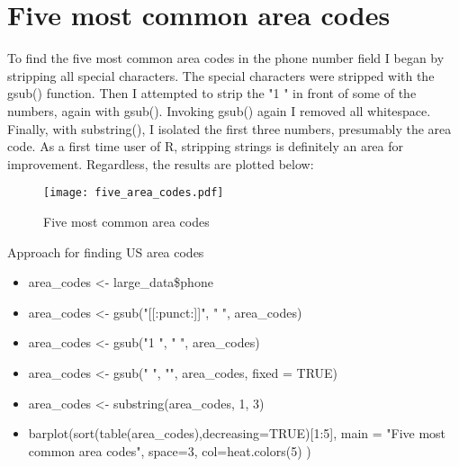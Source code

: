 \documentclass[12pt,fleqn]{report} %
\begin{document}

\chapter{Five most common area codes}

To find the five most common area codes in the phone number field I began by stripping all special characters. The special characters were stripped with the gsub() function. Then I attempted to strip the "1 " in front of some of the numbers, again with gsub(). Invoking gsub() again I removed all whitespace. Finally, with substring(), I isolated the first three numbers, presumably the area code. As a first time user of R, stripping strings is definitely an area for improvement. Regardless, the results are plotted below: 

\begin{figure}[h]
    \centering
    \texttt{[image: five\_area\_codes.pdf]}
    \caption{Five most common area codes}
    \label{fig:common_codes}
\end{figure}

\begin{remark}
Approach for finding US area codes
 \begin{itemize}
    	\item area\_codes <- large\_data\$phone
    	\item area\_codes <- gsub("[[:punct:]]", " ", area\_codes)
    	\item area\_codes <- gsub("1 ", " ", area\_codes)
    	\item area\_codes <- gsub(" ", "", area\_codes, fixed = TRUE)
    	\item area\_codes <- substring(area\_codes, 1, 3)
    	\item barplot(sort(table(area\_codes),decreasing=TRUE)[1:5], main = "Five most common area codes", space=3, col=heat.colors(5) )
    \end{itemize}
\end{remark}
\end{document}
